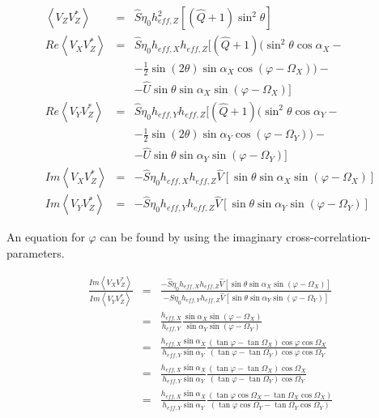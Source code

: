 \documentclass[a4paper,14pt]{extbook}
\begin{document}
\begin{eqnarray}
\left\langle V_Z V_Z^{*} \right\rangle &=& \hat{S}\eta_0 h_{eff,Z}^2[(\hat{Q}+1) \sin^2 \theta]   \\
Re \left\langle V_X V_Z^{*}\right\rangle &=& \hat{S}\eta_0 h_{eff,X} h_{eff,Z}[(\hat{Q}+1) (\sin^2 \theta \cos \alpha_X  - \\
& & - \frac{1}{2}  \sin(2\theta) \sin \alpha_X  \cos(\varphi - \Omega_X))  - \nonumber \\
& & -\hat{U} \sin \theta \sin \alpha_X  \sin (\varphi - \Omega_X)   ]\nonumber \\
Re \left\langle V_Y V_Z^{*}\right\rangle &=& \hat{S}\eta_0 h_{eff,Y} h_{eff,Z}[(\hat{Q}+1) (\sin^2 \theta \cos \alpha_Y  - \\
& & - \frac{1}{2}  \sin(2\theta) \sin \alpha_Y  \cos(\varphi - \Omega_Y))  - \nonumber \\
& & -\hat{U} \sin \theta \sin \alpha_Y  \sin (\varphi - \Omega_Y)   ]\nonumber \\
Im \left\langle V_X V_Z^{*}\right\rangle &=&  -\hat{S}\eta_0 h_{eff,X} h_{eff,Z} \hat{V}[ \sin \theta \sin \alpha_X  \sin (\varphi - \Omega_X) ] \\
Im \left\langle V_Y V_Z^{*}\right\rangle &=&  -\hat{S}\eta_0 h_{eff,Y} h_{eff,Z} \hat{V}[ \sin \theta \sin \alpha_Y  \sin (\varphi - \Omega_Y) ]
\end{eqnarray}


An equation for $\varphi$ can be found by using the imaginary cross-correlation-parameters.

\begin{eqnarray}
\frac{Im \left\langle V_X V_Z^{*}\right\rangle }{Im \left\langle V_Y V_Z^{*}\right\rangle}&=&\frac{- \hat{S}\eta_0 h_{eff,X} h_{eff,Z} \hat{V}[ \sin \theta \sin \alpha_X  \sin (\varphi - \Omega_X) ]}{- \hat{S}\eta_0 h_{eff,Y} h_{eff,Z} \hat{V}[ \sin \theta \sin \alpha_Y  \sin (\varphi - \Omega_Y) ] }\\
&=&\frac{h_{eff,X}}{h_{eff,Y}}\frac{ \sin \alpha_X  \sin (\varphi - \Omega_X) }{ \sin \alpha_Y  \sin (\varphi - \Omega_Y)  }\\
&=&\frac{h_{eff,X} \sin \alpha_X}{h_{eff,Y} \sin \alpha_Y}\frac{(\tan \varphi -\tan \Omega_X)  \cos \varphi \cos \Omega_X}{( \tan \varphi -\tan \Omega_Y) \cos \varphi \cos  \Omega_Y  }\\
&=&\frac{h_{eff,X} \sin \alpha_X}{h_{eff,Y} \sin \alpha_Y}\frac{(\tan \varphi -\tan \Omega_X)  \cos \Omega_X}{( \tan \varphi -\tan \Omega_Y) \cos  \Omega_Y  } \\
&=&\frac{h_{eff,X} \sin \alpha_X}{h_{eff,Y} \sin \alpha_Y}\frac{(\tan \varphi \cos \Omega_X-\tan \Omega_X \cos \Omega_X) }{( \tan \varphi \cos \Omega_Y-\tan \Omega_Y \cos \Omega_Y) }
\end{eqnarray}
\end{document}
